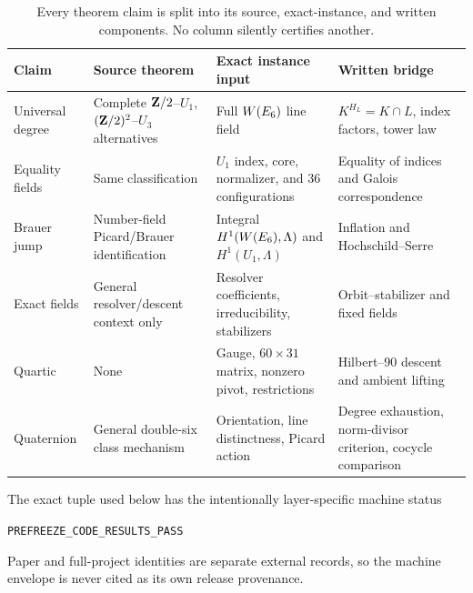 \begin{table}[t]
\centering
\small
\begin{tabularx}{\textwidth}{@{}>{\raggedright\arraybackslash}p{}
  >{\raggedright\arraybackslash}X
  >{\raggedright\arraybackslash}X
  >{\raggedright\arraybackslash}X@{}}
\toprule
Claim & Source theorem & Exact instance input & Written bridge\\
\midrule
Universal degree
& Complete \(\mathbf Z/2\)--\(U_1\), \((\mathbf Z/2)^2\)--\(U_3\) alternatives
& Full \(W(E_6)\) line field
& \(K^{H_L}=K\cap L\), index factors, tower law\\
Equality fields
& Same classification
& \(U_1\) index, core, normalizer, and 36 configurations
& Equality of indices and Galois correspondence\\
Brauer jump
& Number-field Picard/Brauer identification
& Integral \(H^1(W(E_6),\Lambda)\) and \(H^1(U_1,\Lambda)\)
& Inflation and Hochschild--Serre\\
Exact fields
& General resolver/descent context only
& Resolver coefficients, irreducibility, stabilizers
& Orbit--stabilizer and fixed fields\\
Quartic
& None
& Gauge, \(60\times31\) matrix, nonzero pivot, restrictions
& Hilbert--90 descent and ambient lifting\\
Quaternion
& General double-six class mechanism
& Orientation, line distinctness, Picard action
& Degree exhaustion, norm-divisor criterion, cocycle comparison\\
\bottomrule
\end{tabularx}
\caption{Every theorem claim is split into its source, exact-instance, and
written components.  No column silently certifies another.}
\label{tab:dependency-contract}
\end{table}

The exact tuple used below has the intentionally layer-specific machine status
\begin{center}
\nolinkurl{PREFREEZE_CODE_RESULTS_PASS}
\end{center}
Paper and full-project identities are separate external records, so the
machine envelope is never cited as its own release provenance.
